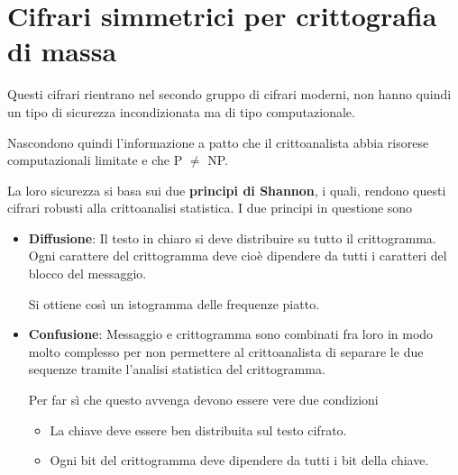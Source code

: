 \chapter{Cifrari simmetrici per crittografia di massa}\label{critto_sim_massa}
Questi cifrari rientrano nel secondo gruppo di cifrari moderni, non hanno quindi un tipo di sicurezza incondizionata ma
di tipo computazionale.

Nascondono quindi l'informazione a patto che il crittoanalista abbia risorese computazionali limitate e che P $\neq$ NP.

La loro sicurezza si basa sui due \textbf{principi di Shannon}, i quali, rendono questi cifrari robusti alla
crittoanalisi statistica. I due principi in questione sono
\begin{itemize}
	\item \textbf{Diffusione}: Il testo in chiaro si deve distribuire su tutto il crittogramma. Ogni carattere del
	      crittogramma deve cio\`e dipendere da tutti i caratteri del blocco del messaggio.

	      Si ottiene cos\`i un istogramma delle frequenze piatto.
	\item \textbf{Confusione}: Messaggio e crittogramma sono combinati fra loro in modo molto complesso per non
	      permettere al crittoanalista di separare le due sequenze tramite l'analisi statistica del crittogramma.

	      Per far s\`i che questo avvenga devono essere vere due condizioni
	      \begin{itemize}
		      \item La chiave deve essere ben distribuita sul testo cifrato.
		      \item Ogni bit del crittogramma deve dipendere da tutti i bit della chiave.
	      \end{itemize}
\end{itemize}

